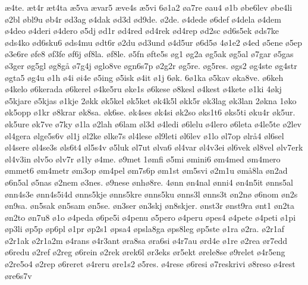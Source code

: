 {^^e64te.
^^e6t4r
^^e6t4ta
^^e65va
^^e6var5
^^e6ve4s
^^e65vi
6^^f81a2
^^f8a7re
^^f8au4
^^f81b
^^f8be6lev
^^f8be4li
^^f82bl
^^f8bl9u
^^f8b4r
^^f8d3ag
^^f84dak
^^f8d3d
^^f8d9de.
^^f82de.
^^f84dede
^^f86def
^^f84dela
^^f84dem
^^f84deo
^^f84deri
^^f84dero
^^f85dj
^^f8d1r
^^f8d4red
^^f8d4rek
^^f8d4rep
^^f8d2sc
^^f8d6s5ek
^^f8ds7ke
^^f8ds4ko
^^f8d6sku6
^^f8ds4mu
^^f8dt6r
^^f82du
^^f8d3und
^^f84d5ur
^^f86d5^^f8
4^^f81e2
^^f84ed
^^f85ene
^^f85ep
^^f83e6re
^^f8fe8
^^f8f3fe
^^f8f6j
^^f8f8la.
^^f8f8le.
^^f85fn
^^f8fte5s
^^f8g1
^^f8g2a
^^f8g5ak
^^f8g5al
^^f87gar
^^f85gas
^^f83ger
^^f8g5gl
^^f8g8g^^e5
^^f87g4j
^^f8glo8ve
^^f8gn6s7p
^^f82g2r
^^f8g5re.
^^f8g5res.
^^f8gs2
^^f8g4ste
^^f8g4str
^^f8gta5
^^f8g4u
^^f81h
^^f84i
^^f8i4e
^^f85ing
^^f85isk
^^f84it
^^f81j
6^^f8k.
6^^f81ka
^^f85kav
^^f8ka8ve.
^^f86keh
^^f84kelo
^^f86kerada
^^f86kerel
^^f84ke5ru
^^f8ke1s
^^f86kese
^^f88kesl
^^f84kest
^^f84kete
^^f81ki
4^^f8kj
^^f85kjare
^^f85kjas
^^f81kje
2^^f8kk
^^f8k5kel
^^f8k5ket
^^f8k4k5l
^^f8kk5r
^^f8k3lag
^^f8k3lan
2^^f8kna
1^^f8ko
^^f8k5opp
^^f81kr
^^f88krar
^^f8k8sa.
^^f8k6se.
^^f8k4ses
^^f8k4si
^^f8k2so
^^f8ks1t6
^^f8ks5ti
^^f8ku4r
^^f8k5ur.
^^f8k5ure
^^f8k7ve
^^f87ky
^^f81la
^^f82lah
^^f86lam
^^f8l3d
^^f84ledi
^^f86lelu
^^f84lero
^^f86leta
^^f84le5te
^^f82lev
^^f8l4gera
^^f8lge5s6v
^^f8l1j
^^f8l2ke
^^f8lke7s
^^f8l4lese
^^f8l9leti
^^f8l6lev
^^f81lo
^^f8l7op
^^f8lr^^e54
^^f8l6sel
^^f8l4sere
^^f8l4se3s
^^f8ls6t4
^^f8l5s4v
^^f85luk
^^f8l7ut
^^f8lva6
^^f8l4var
^^f8l4v3ei
^^f8l6vek
^^f8l8vel
^^f8lv7erk
^^f8l4v3in
^^f8lv5o
^^f8lv7r
^^f81ly
^^f84me.
^^f89met
1^^f8mfi
^^f85mi
^^f8mini6
^^f8m4med
^^f8m4mero
^^f8mmet6
^^f8m4metr
^^f8m3op
^^f8m4pel
^^f8m7s6p
^^f8m1st
^^f8m5svi
^^f82m1u
^^f8m^^e58la
^^f8n2ad
^^f86n5al
^^f85nas
^^f82nem
^^f83nes.
^^f89nese
^^f8nh^^f88re.
4^^f8nn
^^f8n4nal
^^f8nni4
^^f8n4n5it
^^f8nns5al
^^f8nn4s3e
^^f8nn4s5i4d
^^f8nns5kje
^^f8nns5kre
^^f8nns5ku
^^f8nns3l
^^f8nns3t
^^f8n2n^^f8
^^f86nom
^^f8n2s
^^f8n9sa.
^^f8n5sak
^^f8n5sam
^^f8n5se.
^^f8n3ser
^^f8n3skj
^^f8n8skjer.
^^f8nst3r
^^f8nst9ra
^^f8nt1
^^f8n2ta
^^f8n2to
^^f8n7u8
^^f81o
^^f84peda
^^f86pe5i
^^f84penu
^^f85pero
^^f84peru
^^f8pes4
^^f84pete
^^f84peti
^^f81pi
^^f8p3li
^^f8p5p
^^f8p6pl
^^f81pr
^^f8p2s1
^^f8psa4
^^f8psla8ga
^^f8ps8leg
^^f8p5ste
^^f81ra
^^f82ra.
^^f82r1af
^^f82r1ak
^^f82r1a2m
^^f84rans
^^f84r3ant
^^f8ra8sa
^^f8ra6si
^^f84r7au
^^f8rd4e
^^f81re
^^f82rea
^^f8r7edd
^^f86redu
^^f82ref
^^f82reg
^^f86rein
^^f82rek
^^f8rek6l
^^f8r3eks
^^f8r5ekt
^^f8rele8se
^^f89relet
^^f84r5eng
^^f82re5o4
^^f82rep
^^f86reret
^^f84reru
^^f8re1s2
^^f85res.
^^f84rese
^^f86resi
^^f87reskrivi
^^f88reso
^^f84rest
^^f8re6s7v
}
